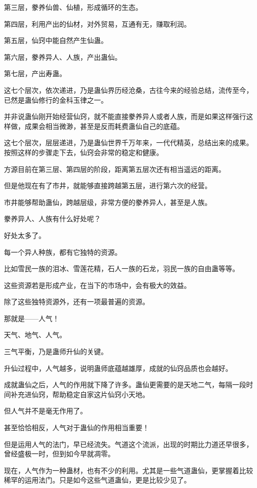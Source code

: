 \begin{this_body}
第三层，豢养仙兽、仙植，形成循环的生态。

第四层，利用产出的仙材，对外贸易，互通有无，赚取利润。

第五层，仙窍中能自然产生仙蛊。

第六层，豢养异人、人族，产出蛊仙。

第七层，产出寿蛊。

这七个层次，依次递进，乃是蛊仙界历经沧桑，古往今来的经验总结，流传至今，已然是蛊仙修行的金科玉律之一。

并非说蛊仙刚开始经营仙窍，就不能直接豢养异人或者人族，而是如果这样强行这样做，成果会相当微渺，甚至是反而耗费蛊仙自己的底蕴。

这七个层次，层层递进，乃是蛊仙世界千万年来，一代代精英，总结出来的成果。按照这样的步骤走下去，仙窍会非常的稳定和健康。

方源目前在第三层、第四层的阶段，距离第五层次还有相当遥远的距离。

但是他现在有了市井，就能够直接跨越第五层，进行第六次的经营。

市井能够帮助蛊仙，跨越层级，非常方便的豢养异人，甚至是人族。

豢养异人、人族有什么好处呢？

好处太多了。

每一个异人种族，都有它独特的资源。

比如雪民一族的泪冰、雪莲花精，石人一族的石龙，羽民一族的自由蛊等等。

这些资源若是形成产业，在当下的市场中，会有极大的效益。

除了这些独特资源外，还有一项最普遍的资源。

那就是——人气！

天气、地气、人气。

三气平衡，乃是蛊师升仙的关键。

升仙过程中，人气越多，说明蛊师底蕴越雄厚，成就的仙窍品质也会越好。

成就蛊仙之后，人气的作用就下降了许多。蛊仙更需要的是天地二气，每隔一段时间补充进仙窍，帮助稳定自家这片仙窍小天地。

但人气并不是毫无作用了。

甚至恰恰相反，人气对于蛊仙的作用相当重要！

但是运用人气的法门，早已经流失。气道这个流派，出现的时期比力道还早很多，曾经盛极一时，但到如今早就凋零。

现在，人气作为一种蛊材，也有不少的利用。尤其是一些气道蛊仙，更掌握着比较稀罕的运用法门。只是如今这些气道蛊仙，更是比较少见了。


\end{this_body}
